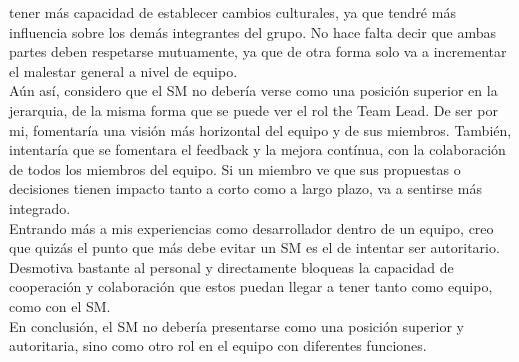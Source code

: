 \documentclass[a4paper, 11pt, oneside]{article}
\begin{document}
tener más capacidad de establecer cambios culturales, ya que tendré más
influencia sobre los demás integrantes del grupo. No hace falta decir que ambas
partes deben respetarse mutuamente, ya que de otra forma solo va a incrementar
el malestar general a nivel de equipo.
\\[8pt]
Aún así, considero que el SM no debería verse como una posición superior en la
jerarquia, de la misma forma que se puede ver el rol the Team Lead. De ser por
mi, fomentaría una visión más horizontal del equipo y de sus miembros. También,
intentaría que se fomentara el feedback y la mejora contínua, con la
colaboración de todos los miembros del equipo. Si un miembro ve que sus
propuestas o decisiones tienen impacto tanto a corto como a largo plazo, va a
sentirse más integrado.
\\
Entrando más a mis experiencias como desarrollador dentro de un equipo, creo que
quizás el punto que más debe evitar un SM es el de intentar ser autoritario.
Desmotiva bastante al personal y directamente bloqueas la capacidad de
cooperación y colaboración que estos puedan llegar a tener tanto como equipo,
como con el SM.
\\
En conclusión, el SM no debería presentarse como una posición superior y
autoritaria, sino como otro rol en el equipo con diferentes funciones.
\end{document}
